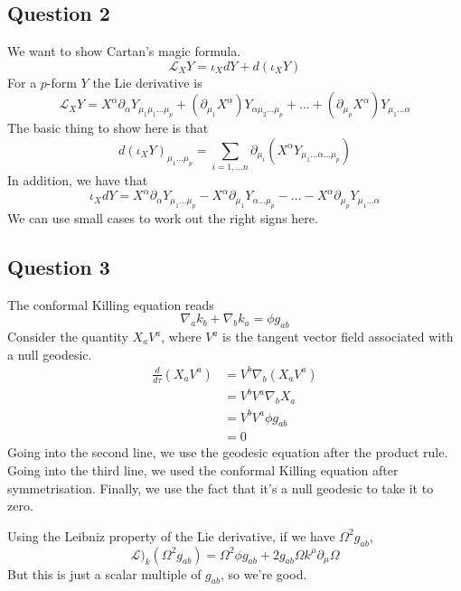 \documentclass[11pt, oneside]{article}   	%
\theoremstyle{slanted}
\begin{document}
\subsection*{Question 2}
We want to show 
Cartan's magic formula. 
\[
\mathcal{ L } _{ X} Y   = \iota_{ X } d Y + d \left(\iota _ X Y   \right) 
\] For a $ p$-form $ Y $ the Lie derivative 
is 
\[
\mathcal{ L } _{ X} Y = X ^ \alpha \partial  _ \alpha Y_{ 
\mu_1 \mu_1 \dots \mu_{ p } } + \left( \partial_{ \mu_1  } X^ \alpha \right) Y_{ 
\alpha \mu_2 \dots \mu_ p } + \dots + \left( \partial_{ \mu_{ p } } X ^ \alpha  \right)  
Y _{ \mu_1 \dots \alpha }
\]  
The basic thing to show here is 
that 
\[
d \left( \iota_ X Y  \right) _{ 
\mu_1 \dots \mu_ p }  = \sum_{ i  = 1, \dots n } \partial _{ \mu _ i } 
\left(  X ^{ \alpha } Y_{ \mu_1 \dots \alpha \dots \mu_{ p } } \right) 
\] In addition, we have that 
\[
\iota_X  d Y  = X ^{ \alpha } \partial  _ \alpha Y_{ 
\mu_1 \dots \mu _ p  }   - X^ \alpha \partial _{ \mu_1 } Y_{ \alpha \dots \mu_ p  }
- \dots  - X ^ \alpha \partial  _{ \mu_ p } Y_{ \mu _ 1 \dots \alpha }
\] 
We can use small cases 
to work out the right signs here. 

\subsection{Question 3}
The conformal Killing equation 
reads 
\[
	\nabla _ a k _ b + \nabla _ b k _ a = \phi g _{ ab } 
\] Consider 
the quantity $ X _ a V ^ a $, where 
$ V ^ a  $ is the tangent vector 
field associated with a null geodesic. 
\begin{align*}
	\frac{d }{ d \tau} \left( X _ a V ^ a  \right)  
	&=   V ^ b \nabla  _ b \left(  X_ a V ^ a  \right)   \\ 
	&=  V ^ b V ^ a \nabla _ b X_ a  \\
	&=  V ^ b V ^ a  \phi g _{ ab }  \\ 
	&=   0 
\end{align*} 
Going into the second line, 
we use the geodesic equation after the product rule. 
Going into the third line, 
we used the conformal Killing equation 
after symmetrisation. 
Finally, we use the fact that it's a null geodesic to 
take it to zero. 

Using the Leibniz property 
of the Lie derivative, 
if we have $ \Omega ^ 2 g _{ ab } $, 
\[
	\mathcal{ L } )_ k \left( \Omega ^ 2 g _{ ab }  \right)  
	= \Omega^ 2 \phi g _{ ab }  + 2 g _{ ab } \Omega k ^ \mu \partial  _ \mu 
	\Omega 
\] But this is just a scalar multiple of $ g _{ ab } $, 
so we're good.
\end{document}
